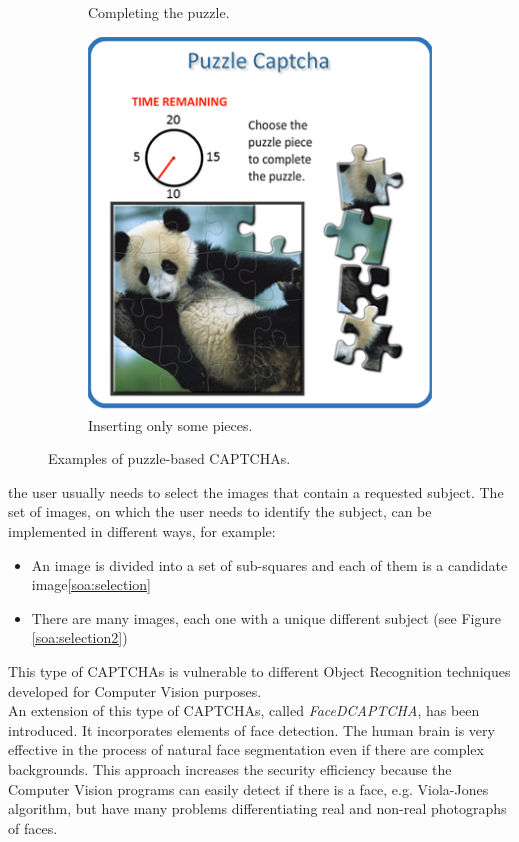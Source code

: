 \begin{itemize}
{\begin{figure}[h]
\begin{subfigure}[b]{0.48\textwidth}
         \caption{\footnotesize{Completing the puzzle.}}
         \label{soa:puzzle}
     \end{subfigure}
     \hfill
     \begin{subfigure}[b]{0.48\textwidth}
         \centering
         \includegraphics[width=.6\linewidth]{Images/StateOfArt/puzzle_CAPTCHA2}
         \caption{\footnotesize{Inserting only some pieces.}}
        \label{soa:puzzle2}
     \end{subfigure}
     \caption{\footnotesize{Examples of puzzle-based CAPTCHAs.}}
\end{figure}
}
{the user usually needs to select the images that contain a requested subject. The set of images, on which the user needs to identify the subject, can be implemented in different ways, for example:
\begin{itemize}
\item{An image is divided into a set of sub-squares and each of them is a candidate image\ref{soa:selection}}
\item{There are many images, each one with a unique different subject (see Figure \ref{soa:selection2})}
\end{itemize}
This type of CAPTCHAs is vulnerable to different Object Recognition techniques developed for Computer Vision purposes.\\
An extension of this type of CAPTCHAs, called \textit{FaceDCAPTCHA}, has been introduced\cite{FaceDCAPTCHA}. It incorporates elements of face detection. The human brain is very effective in the process of natural face segmentation even if there are complex backgrounds. This approach increases the security efficiency because the Computer Vision programs can easily detect if there is a face, e.g. Viola-Jones algorithm\cite{Viola_Jones}, but have many problems differentiating real and non-real photographs of faces.\\
}
\end{itemize}
